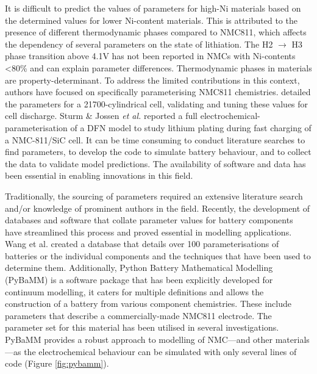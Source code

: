 \documentclass[aps,prb,twocolumn,superscriptaddress,reprint]{revtex4-1}
\begin{document}
It is difficult to predict the values of parameters for high-Ni materials based on the determined values for lower Ni-content materials.\cite{Amin_Chiang_2016} 
This is attributed to the presence of different thermodynamic phases compared to NMC811, which affects the dependency of several parameters on the state of lithiation. 
The H2 $\rightarrow$ H3 phase transition above 4.1V has not been reported in NMCs with Ni-contents \textless80\% and can explain parameter differences.\cite{jung2017oxygen} 
Thermodynamic phases in materials are  property-determinant. To address the limited contributions in this context, authors have focused on specifically parameterising NMC811 chemistries. 
\citeauthor{Chen2020} detailed the parameters for a 21700-cylindrical cell, validating and tuning these values for cell discharge.\cite{Chen2020} 
Sturm \& Jossen \textit{et al.} reported a full electrochemical-parameterisation of a DFN model to study lithium plating during fast charging of a NMC-811/SiC cell.\cite{Sturm2019b,Sturm2019} 
It can be time consuming to conduct literature searches to find parameters, to develop the code to simulate battery behaviour, and to collect the data to validate model predictions. 
The availability of software and data has been essential in enabling innovations in this field.

Traditionally, the sourcing of parameters required an extensive literature search and/or knowledge of prominent authors in the field. 
Recently, the development of databases and software that collate parameter values for battery components have streamlined this process and proved essential in modelling applications. \cite{Tranter2020,Tranter_2020b} 
Wang et al. created a database that details over 100 parameterisations of batteries or the individual components and the techniques that have been used to determine them. 
Additionally, Python Battery Mathematical Modelling (PyBaMM) is a software package that has been explicitly developed for continuum modelling, it caters for multiple definitions and allows the construction of a battery from various component chemistries.\cite{Sulzer_2020} 
These include parameters that describe a commercially-made NMC811 electrode.\cite{Chen2020} 
The parameter set for this material has been utilised in several investigations.\cite{Tranter2020,Tranter_2020b} 
PyBaMM provides a robust approach to modelling of NMC—and other materials—as the electrochemical behaviour can be simulated with only several lines of code (Figure \ref{fig:pybamm}).
\end{document}
